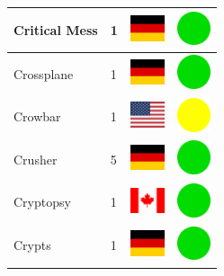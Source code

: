 \documentclass[12pt, a4paper, twoside]{report}
\begin{document}
\begin{center}
\begin{longtable}{|p{5cm}|p{2cm}|p{2cm}|p{2cm}|}
			Critical Mess & 1 & \includegraphics[width=1cm]{4x3/de} & \includegraphics[width=1cm]{likes/y} \\ \hline
			Crossplane & 1 & \includegraphics[width=1cm]{4x3/de} & \includegraphics[width=1cm]{likes/y} \\ \hline
			Crowbar & 1 & \includegraphics[width=1cm]{4x3/us} & \includegraphics[width=1cm]{likes/m} \\ \hline
			Crusher & 5 & \includegraphics[width=1cm]{4x3/de} & \includegraphics[width=1cm]{likes/y} \\ \hline
			Cryptopsy & 1 & \includegraphics[width=1cm]{4x3/ca} & \includegraphics[width=1cm]{likes/y} \\ \hline
			Crypts & 1 & \includegraphics[width=1cm]{4x3/de} & \includegraphics[width=1cm]{likes/y} \\ \hline

\end{longtable}
\end{center}
\end{document}
